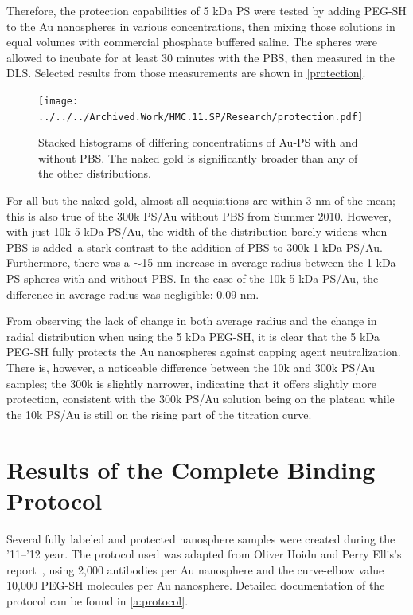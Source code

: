 Therefore, the protection capabilities of 5 kDa PS were tested by adding PEG-SH to the Au nanospheres in various concentrations, then mixing those solutions in equal volumes with commercial phosphate buffered saline. The spheres were allowed to incubate for at least 30 minutes with the PBS, then measured in the DLS. Selected results from those measurements are shown in \autoref{protection}.

\begin{figure}[htbp]
\centering
\texttt{[image: ../../../Archived.Work/HMC.11.SP/Research/protection.pdf]}
\caption{Stacked histograms of differing concentrations of Au-PS with and without PBS. The naked gold is significantly broader than any of the other distributions.}
\label{protection}
\end{figure}



For all but the naked gold, almost all acquisitions are within 3 nm of the mean; this is also true of the 300k PS\slash Au without PBS from Summer 2010. However, with just 10k 5 kDa PS\slash Au, the width of the distribution barely widens when PBS is added--a stark contrast to the addition of PBS to 300k 1 kDa PS\slash Au. Furthermore, there was a \ensuremath{\sim}15 nm increase in average radius between the 1 kDa PS spheres with and without PBS. In the case of the 10k 5 kDa PS\slash Au, the difference in average radius was negligible: 0.09 nm.

From observing the lack of change in both average radius and the change in radial distribution when using the 5 kDa PEG-SH, it is clear that the 5 kDa PEG-SH fully protects the Au nanospheres against capping agent neutralization. There is, however, a noticeable difference between the 10k and 300k PS\slash Au samples; the 300k is slightly narrower, indicating that it offers slightly more protection, consistent with the 300k PS\slash Au solution being on the plateau while the 10k PS\slash Au is still on the rising part of the titration curve.

\chapter{Results of the Complete Binding Protocol}
\label{resultsofthecompletebindingprotocol}

Several fully labeled and protected nanosphere samples were created during the '11--'12 year. The protocol used was adapted from Oliver Hoidn and Perry Ellis's report~\citep{hoidnellis}, using 2,000 antibodies per Au nanosphere and the curve-elbow value 10,000 PEG-SH molecules per Au nanosphere. Detailed documentation of the protocol can be found in \autoref{a:protocol}.

